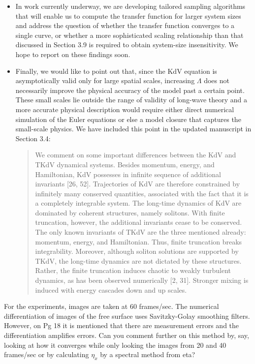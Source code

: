 \documentclass[11pt]{article}
\newcommand{\comment}[1]{{\color{blue} #1}}
\begin{document}
\begin{itemize}
\item In  work currently underway, we are developing tailored sampling algorithms that will enable us to compute the transfer function for larger system sizes and address the question of whether the transfer function converges to a single curve, or whether a more sophisticated scaling relationship than that discussed in Section 3.9 is required to obtain system-size insensitivity. We hope to report on these findings soon.

\item Finally, we would like to point out that, since the KdV equation is asymptotically valid only for large spatial scales, increasing $\Lambda$ does not necessarily improve the physical accuracy of the model past a certain point. These small scales lie outside the range of validity of long-wave theory and a more accurate physical description would require either direct numerical simulation of the Euler equations or else a model closure that captures the small-scale physics. We have included this point in the updated manuscript in Section 3.4:
\begin{quotation}
We comment on some important differences between the KdV and TKdV dynamical systems. Besides momentum, energy, and Hamiltonian, KdV possesses in infinite sequence of additional invariants [26, 52]. Trajectories of KdV are therefore constrained by infinitely many conserved quantities, associated with the fact that it is a completely integrable system. The long-time dynamics of KdV are dominated by coherent structures, namely solitons. With finite truncation, however, the additional invariants cease to be conserved. The only known invariants of TKdV are the three mentioned already: momentum, energy, and Hamiltonian. Thus, finite truncation breaks integrability. Moreover, although soliton solutions are supported by TKdV, the long-time dynamics are not dictated by these structures. Rather, the finite truncation induces chaotic to weakly turbulent dynamics, as has been observed numerically [2, 31]. Stronger mixing is induced
with energy cascades down and up scales.
\end{quotation}
\end{itemize}

\noindent
\comment{For the experiments, images are taken at 60 frames/sec. The numerical differentiation of images of the free surface uses Savitzky-Golay smoothing filters. However, on Pg 18 it is mentioned that there are measurement errors and the differentiation amplifies errors. Can you comment further on this method by, say, looking at how it converges while only looking the images from 20 and 40 frames/sec or by calculating $\eta_x$ by a spectral method from eta? }
\end{document}
